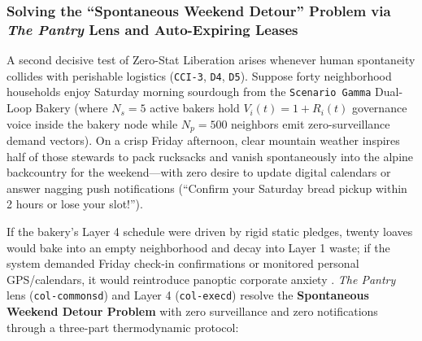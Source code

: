 \subsubsection{Solving the ``Spontaneous Weekend Detour'' Problem via \emph{The Pantry} Lens and Auto-Expiring Leases}

A second decisive test of Zero-Stat Liberation arises whenever human spontaneity collides with perishable logistics (\texttt{CCI-3}, \texttt{D4}, \texttt{D5}). Suppose forty neighborhood households enjoy Saturday morning sourdough from the \texttt{Scenario Gamma} Dual-Loop Bakery (where $N_s = 5$ active bakers hold $V_i(t) = 1 + R_i(t)$ governance voice inside the bakery node while $N_p = 500$ neighbors emit zero-surveillance demand vectors). On a crisp Friday afternoon, clear mountain weather inspires half of those stewards to pack rucksacks and vanish spontaneously into the alpine backcountry for the weekend---with zero desire to update digital calendars or answer nagging push notifications (``Confirm your Saturday bread pickup within 2 hours or lose your slot!'').

If the bakery's Layer 4 schedule were driven by rigid static pledges, twenty loaves would bake into an empty neighborhood and decay into Layer 1 waste; if the system demanded Friday check-in confirmations or monitored personal GPS/calendars, it would reintroduce panoptic corporate anxiety \parencite{zuboff2019,han2015}. \emph{The Pantry} lens (\texttt{col-commonsd}) and Layer 4 (\texttt{col-execd}) resolve the \textbf{Spontaneous Weekend Detour Problem} with zero surveillance and zero notifications through a three-part thermodynamic protocol:

